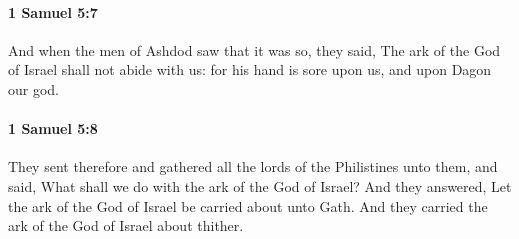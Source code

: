 		\paragraph{1 Samuel 5:7} %
			\label{1SAMUEL-5-7}

			And when the men of Ashdod saw that it was so, they said, The ark of the God of Israel shall not abide with us: for his hand is sore upon us, and upon Dagon our god.


		\paragraph{1 Samuel 5:8} %
			\label{1SAMUEL-5-8}

			They sent therefore and gathered all the lords of the Philistines unto them, and said, What shall we do with the ark of the God of Israel? And they answered, Let the ark of the God of Israel be carried about unto Gath. And they carried the ark of the God of Israel about thither.

